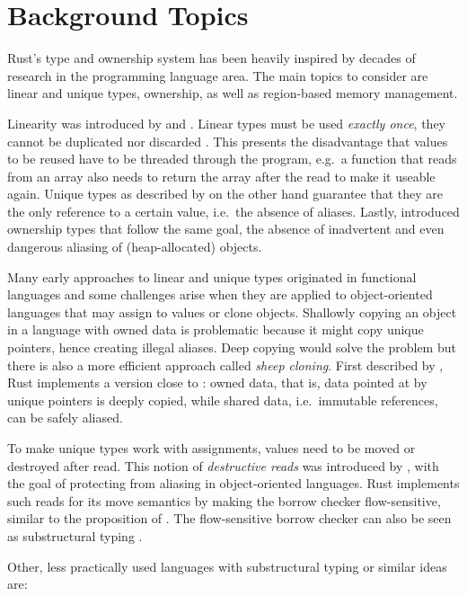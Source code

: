\section{Background Topics}

Rust's type and ownership system has been heavily inspired by decades of
research in the programming language area. The main topics to consider are
linear and unique types, ownership, as well as region-based memory management.

Linearity was introduced by \citet{girard} and \citet{Wadler90lineartypes}.
Linear types must be used \emph{exactly once}, they cannot be duplicated nor
discarded \cite{use-once}. This presents the disadvantage that values to be
reused have to be threaded through the program, e.g.~a function that reads from
an array also needs to return the array after the read to make it useable again.
Unique types as described by \citet{alias-free-pointers} on the other hand
guarantee that they are the only reference to a certain value, i.e.~the absence
of aliases. Lastly, \citet{ownership-types} introduced ownership types that
follow the same goal, the absence of inadvertent and even dangerous aliasing of
(heap-allocated) objects.

Many early approaches to linear and unique types originated in functional
languages and some challenges arise when they are applied to object-oriented
languages that may assign to values or clone objects. Shallowly copying an
object in a language with owned data is problematic because it might copy unique
pointers, hence creating illegal aliases. Deep copying would solve the problem
but there is also a more efficient approach called \emph{sheep cloning}. First
described by \citet{dynamic-alias-protection}, Rust implements a version close
to \cite{sheep-cloning}: owned data, that is, data pointed at by unique pointers
is deeply copied, while shared data, i.e.~immutable references, can be safely
aliased.

To make unique types work with assignments, values need to be moved or destroyed
after read. This notion of \emph{destructive reads} was introduced by
\citet{islands-alias-protection}, with the goal of protecting from aliasing in
object-oriented languages. Rust implements such reads for its move semantics by
making the borrow checker flow-sensitive, similar to the proposition of
\citet{alias-burying}. The flow-sensitive borrow checker can also be seen as
substructural typing \cite{oxide}.

Other, less practically used languages with substructural typing or
similar ideas are:

